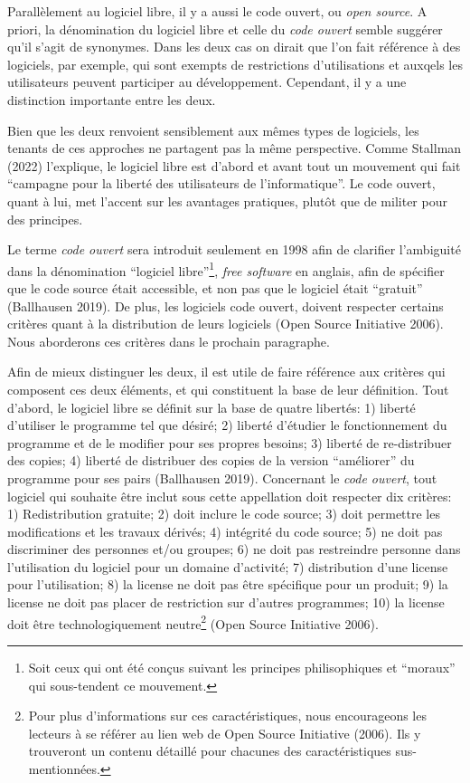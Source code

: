 \documentclass[
  letterpaper,
]{scrbook}
\begin{document}
Parallèlement au logiciel libre, il y a aussi le code ouvert, ou
\emph{open source}. A priori, la dénomination du logiciel libre et celle
du \emph{code ouvert} semble suggérer qu'il s'agit de synonymes. Dans
les deux cas on dirait que l'on fait référence à des logiciels, par
exemple, qui sont exempts de restrictions d'utilisations et auxqels les
utilisateurs peuvent participer au développement. Cependant, il y a une
distinction importante entre les deux.

Bien que les deux renvoient sensiblement aux mêmes types de logiciels,
les tenants de ces approches ne partagent pas la même perspective. Comme
Stallman (2022) l'explique, le logiciel libre est d'abord et avant tout
un mouvement qui fait ``campagne pour la liberté des utilisateurs de
l'informatique''. Le code ouvert, quant à lui, met l'accent sur les
avantages pratiques, plutôt que de militer pour des principes.

Le terme \emph{code ouvert} sera introduit seulement en 1998 afin de
clarifier l'ambiguité dans la dénomination ``logiciel
libre''\footnote{Soit ceux qui ont été conçus suivant les principes
  philisophiques et ``moraux'' qui sous-tendent ce mouvement.},
\emph{free software} en anglais, afin de spécifier que le code source
était accessible, et non pas que le logiciel était ``gratuit''
(Ballhausen 2019). De plus, les logiciels code ouvert, doivent respecter
certains critères quant à la distribution de leurs logiciels (Open
Source Initiative 2006). Nous aborderons ces critères dans le prochain
paragraphe.

Afin de mieux distinguer les deux, il est utile de faire référence aux
critères qui composent ces deux éléments, et qui constituent la base de
leur définition. Tout d'abord, le logiciel libre se définit sur la base
de quatre libertés: 1) liberté d'utiliser le programme tel que désiré;
2) liberté d'étudier le fonctionnement du programme et de le modifier
pour ses propres besoins; 3) liberté de re-distribuer des copies; 4)
liberté de distribuer des copies de la version ``améliorer'' du
programme pour ses pairs (Ballhausen 2019). Concernant le \emph{code
ouvert}, tout logiciel qui souhaite être inclut sous cette appellation
doit respecter dix critères: 1) Redistribution gratuite; 2) doit inclure
le code source; 3) doit permettre les modifications et les travaux
dérivés; 4) intégrité du code source; 5) ne doit pas discriminer des
personnes et/ou groupes; 6) ne doit pas restreindre personne dans
l'utilisation du logiciel pour un domaine d'activité; 7) distribution
d'une license pour l'utilisation; 8) la license ne doit pas être
spécifique pour un produit; 9) la license ne doit pas placer de
restriction sur d'autres programmes; 10) la license doit être
technologiquement neutre\footnote{Pour plus d'informations sur ces
  caractéristiques, nous encourageons les lecteurs à se référer au lien
  web de Open Source Initiative (2006). Ils y trouveront un contenu
  détaillé pour chacunes des caractéristiques sus-mentionnées.} (Open
Source Initiative 2006).
\end{document}

